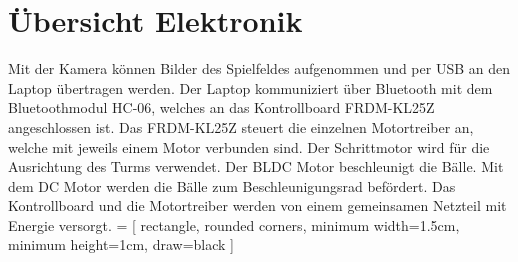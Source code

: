 \section{Übersicht Elektronik}
Mit der Kamera können Bilder des Spielfeldes aufgenommen und per USB an den 
Laptop übertragen werden. Der Laptop kommuniziert über Bluetooth mit dem 
Bluetoothmodul HC-06, welches an das Kontrollboard FRDM-KL25Z angeschlossen 
ist. Das FRDM-KL25Z steuert die einzelnen Motortreiber an, welche mit jeweils 
einem Motor verbunden sind. Der Schrittmotor wird für die Ausrichtung des 
Turms verwendet. Der BLDC Motor beschleunigt die Bälle. Mit dem DC Motor 
werden die Bälle zum Beschleunigungsrad befördert. Das Kontrollboard und die 
Motortreiber werden von einem gemeinsamen Netzteil mit Energie versorgt. 
 = [ rectangle, rounded corners, minimum width=1.5cm, minimum height=1cm, draw=black ]
